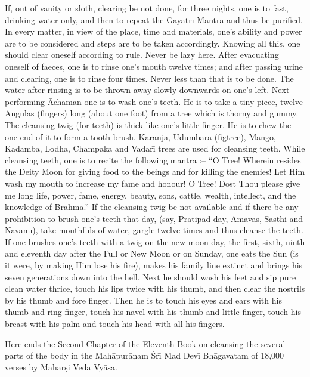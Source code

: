 If, out of vanity or sloth, clearing be not done, for three nights, one is to fast, drinking water only, and then to repeat the G\=ayatr\={\i} Mantra and thus be purified. In every matter, in view of the place, time and materials, one's ability and power are to be considered and steps are to be taken accordingly. Knowing all this, one should clear oneself according to rule. Never be lazy here. After evacuating oneself of faeces, one is to rinse one's mouth twelve times; and after passing urine and clearing, one is to rinse four times. Never less than that is to be done. The water after rinsing is to be thrown away slowly downwards on one's left. Next performing \=Achaman one is to wash one's teeth. He is to take a tiny piece, twelve \=Angulas (fingers) long (about one foot) from a tree which is thorny and gummy. The cleansing twig (for teeth) is thick like one's little finger. He is to chew the one end of it to form a tooth brush. Karanja, Udumbara (figtree), Mango, Kadamba, Lodha, Champaka and Vadar\={\i} trees are used for cleansing teeth. While cleansing teeth, one is to recite the following mantra :-- ``O Tree! Wherein resides the Deity Moon for giving food to the beings and for killing the enemies! Let Him wash my mouth to increase my fame and honour! O Tree! Dost Thou please give me long life, power, fame, energy, beauty, sons, cattle, wealth, intellect, and the knowledge of Brahm\=a.'' If the cleansing twig be not available and if there be any prohibition to brush one's teeth that day, (say, Pratipad day, Am\=avas, Sasthi and Navam\={\i}), take mouthfuls of water, gargle twelve times and thus cleanse the teeth. If one brushes one's teeth with a twig on the new moon day, the first, sixth, ninth and eleventh day after the Full or New Moon or on Sunday, one eats the Sun (is it were, by making Him lose his fire), makes his family line extinct and brings his seven generations down into the hell. Next he should wash his feet and sip pure clean water thrice, touch his lips twice with his thumb, and then clear the nostrils by his thumb and fore finger. Then he is to touch his eyes and ears with his thumb and ring finger, touch his navel with his thumb and little finger, touch his breast with his palm and touch his head with all his fingers.

Here ends the Second Chapter of the Eleventh Book on cleansing the several parts of the body in the Mah\=apur\=a\d{n}am \'Sr\={\i} Mad Dev\={\i} Bh\=agavatam of 18,000 verses by Mahar\d{s}i Veda Vy\=asa.



